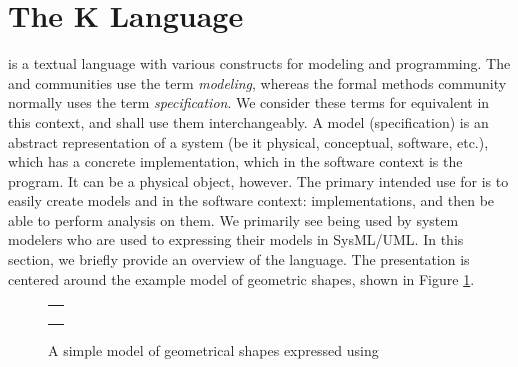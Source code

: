 \section{The K Language}
\label{sec:k}

\Klang{} is a textual language with various constructs for modeling
and programming. The \uml{} and \sysml{} communities use the term {\em
  modeling}, whereas the formal methods community normally uses the
term {\em specification}. We consider these terms for equivalent in
this context, and shall use them interchangeably. A model
(specification) is an abstract representation of a system (be it
physical, conceptual, software, etc.), which has a concrete
implementation, which in the software context is the program. It can
be a physical object, however. The primary intended use for \Klang{}
is to easily create models and in the software context:
implementations, and then be able to perform analysis on them. We
primarily see \Klang{} being used by system modelers who are used to
expressing their models in SysML/UML. In this section, we briefly
provide an overview of the \Klang{} language. The presentation is
centered around the example \Klang{} model of geometric shapes, shown
in Figure \ref{fig:shapes}.

\begin{figure}
\centering
\begin{tabular}{c}
\hline \\
 \\ \\
\hline
\end{tabular}
\caption{A simple model of geometrical shapes expressed using \Klang{}}
\label{fig:shapes}
\end{figure}


